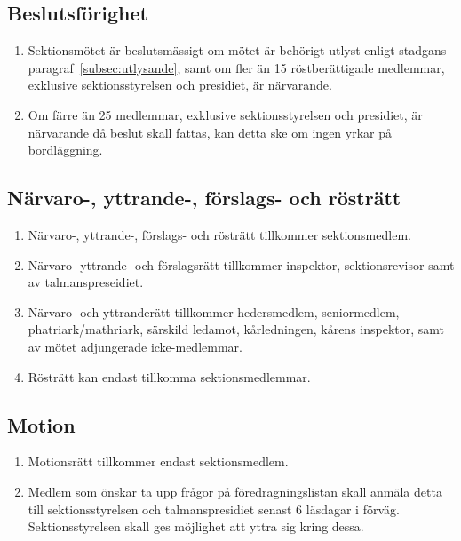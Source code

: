 \documentclass[11pt,a4paper]{article}
\begin{document}
\subsection{Beslutsförighet}
\begin{enumerate}[\thesubsection.1]

  \item Sektionsmötet är beslutsmässigt om mötet är behörigt utlyst
  enligt stadgans paragraf~\ref{subsec:utlysande}, samt om fler än 15 röstberättigade medlemmar, exklusive sektionsstyrelsen och presidiet, är närvarande.

  \item Om färre än 25 medlemmar, exklusive sektionsstyrelsen och presidiet, är närvarande då beslut skall fattas, kan detta ske om ingen yrkar på bordläggning.
  

\end{enumerate}

\subsection{Närvaro-, yttrande-, förslags- och rösträtt}
\begin{enumerate}[\thesubsection.1]

  \item Närvaro-, yttrande-, förslags- och rösträtt tillkommer sektionsmedlem.
  
  \item Närvaro- yttrande- och förslagsrätt tillkommer inspektor, sektionsrevisor samt av talmanspreseidiet.
  
  \item Närvaro- och yttranderätt tillkommer
  heders\-med\-lem, seniormedlem, phatriark/mathriark, särskild ledamot, kårledningen, kårens inspektor, samt av mötet adjungerade icke-medlemmar.

  \item Rösträtt kan endast tillkomma sektionsmedlemmar.

\end{enumerate}

\subsection{Motion}
\begin{enumerate}[\thesubsection.1]

  \item Motionsrätt tillkommer endast sektionsmedlem.

  \item Medlem som önskar ta upp frågor på föredragningslistan skall
  anmäla detta till sektionsstyrelsen och talmanspresidiet senast 6 läsdagar i förväg. Sektionsstyrelsen skall ges möjlighet att yttra sig kring dessa.
    
\end{enumerate}
\end{document}
